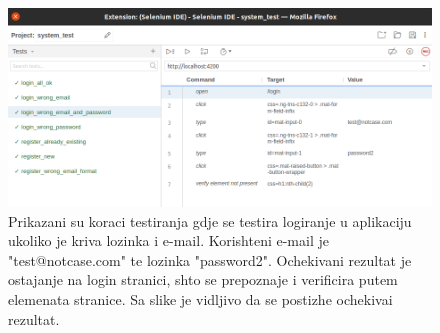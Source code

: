 {            \begin{figure}[H]
                \includegraphics[width=\textwidth]{slike/tests_system/login_wrong_email_and_password.png} %
                \caption{Prikazani su koraci testiranja gdje se testira logiranje u aplikaciju ukoliko je kriva lozinka i e-mail. Korishteni e-mail je "test@notcase.com" te lozinka "password2". Ochekivani rezultat je ostajanje na login stranici, shto se prepoznaje i verificira putem elemenata stranice. Sa slike je vidljivo da se postizhe ochekivai rezultat.}
                \label{fig:struktura} %
            \end{figure}

}
